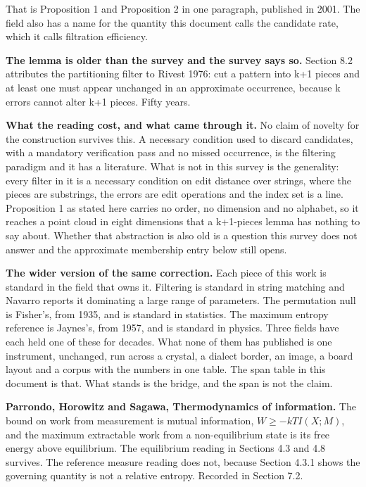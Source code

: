 That is Proposition 1 and Proposition 2 in one paragraph, published in 2001. The field also has a name for the quantity this document calls the candidate rate, which it calls filtration efficiency.

\textbf{The lemma is older than the survey and the survey says so.} Section 8.2 attributes the partitioning filter to Rivest 1976: cut a pattern into k+1 pieces and at least one must appear unchanged in an approximate occurrence, because k errors cannot alter k+1 pieces. Fifty years.

\textbf{What the reading cost, and what came through it.} No claim of novelty for the construction survives this. A necessary condition used to discard candidates, with a mandatory verification pass and no missed occurrence, is the filtering paradigm and it has a literature. What is not in this survey is the generality: every filter in it is a necessary condition on edit distance over strings, where the pieces are substrings, the errors are edit operations and the index set is a line. Proposition 1 as stated here carries no order, no dimension and no alphabet, so it reaches a point cloud in eight dimensions that a k+1-pieces lemma has nothing to say about. Whether that abstraction is also old is a question this survey does not answer and the approximate membership entry below still opens.

\textbf{The wider version of the same correction.} Each piece of this work is standard in the field that owns it. Filtering is standard in string matching and Navarro reports it dominating a large range of parameters. The permutation null is Fisher's, from 1935, and is standard in statistics. The maximum entropy reference is Jaynes's, from 1957, and is standard in physics. Three fields have each held one of these for decades. What none of them has published is one instrument, unchanged, run across a crystal, a dialect border, an image, a board layout and a corpus with the numbers in one table. The span table in this document is that. What stands is the bridge, and the span is not the claim.

\textbf{Parrondo, Horowitz and Sagawa, Thermodynamics of information.} The bound on work from measurement is mutual information, \(W \ge -kTI(X;M)\), and the maximum extractable work from a non-equilibrium state is its free energy above equilibrium. The equilibrium reading in Sections 4.3 and 4.8 survives. The reference measure reading does not, because Section 4.3.1 shows the governing quantity is not a relative entropy. Recorded in Section 7.2.

